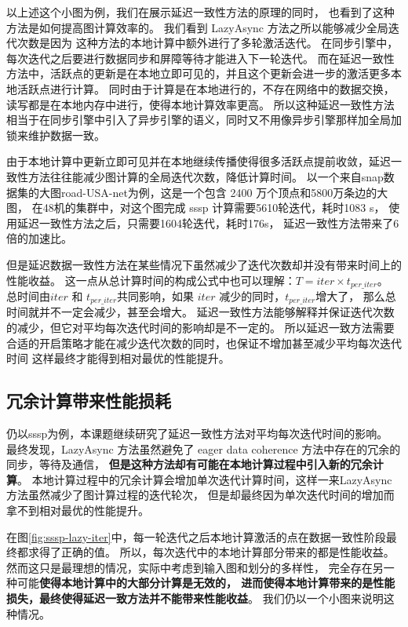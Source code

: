 以上述这个小图为例，我们在展示延迟一致性方法的原理的同时，
也看到了这种方法是如何提高图计算效率的。
我们看到 LazyAsync 方法之所以能够减少全局迭代次数是因为
这种方法的本地计算中额外进行了多轮激活迭代。
在同步引擎中，每次迭代之后要进行数据同步和屏障等待才能进入下一轮迭代。
而在延迟一致性方法中，活跃点的更新是在本地立即可见的，并且这个更新会进一步的激活更多本地活跃点进行计算。
同时由于计算是在本地进行的，不存在网络中的数据交换，读写都是在本地内存中进行，使得本地计算效率更高。
所以这种延迟一致性方法相当于在同步引擎中引入了异步引擎的语义\cite{Ju@MACS17}，同时又不用像异步引擎那样加全局加锁来维护数据一致\cite{Xie@PPoPP15}。

由于本地计算中更新立即可见并在本地继续传播使得很多活跃点提前收敛，延迟一致性方法往往能减少图计算的全局迭代次数，降低计算时间。
以一个来自snap\cite{SNAP}数据集的大图road-USA-net为例，这是一个包含 2400 万个顶点和5800万条边的大图，
在48机的集群中，对这个图完成 sssp 计算需要5610轮迭代，耗时1083 s， 使用延迟一致性方法之后，只需要1604轮迭代，耗时176s，
延迟一致性方法带来了6倍的加速比。

但是延迟数据一致性方法在某些情况下虽然减少了迭代次数却并没有带来时间上的性能收益。
这一点从总计算时间的构成公式\cite{bsp@1990}中也可以理解：$T=iter \times t_{per\_iter}$。
总时间由$iter$ 和 $t_{per\_iter}$共同影响，如果 $iter$ 减少的同时，$t_{per\_iter}$增大了，
那么总时间就并不一定会减少，甚至会增大。
延迟一致性方法能够解释并保证迭代次数的减少，但它对平均每次迭代时间的影响却是不一定的。
所以延迟一致方法需要合适的开启策略才能在减少迭代次数的同时，也保证不增加甚至减少平均每次迭代时间
这样最终才能得到相对最优的性能提升。

\subsection{冗余计算带来性能损耗}
仍以sssp为例，本课题继续研究了延迟一致性方法对平均每次迭代时间的影响。
最终发现，LazyAsync 方法虽然避免了 eager data coherence 方法中存在的冗余的同步，等待及通信，
\textbf{但是这种方法却有可能在本地计算过程中引入新的冗余计算}。
本地计算过程中的冗余计算会增加单次迭代计算时间，这样一来LazyAsync方法虽然减少了图计算过程的迭代轮次，
但是却最终因为单次迭代时间的增加而拿不到相对最优的性能提升。


在图\ref{fig:sssp-lazy-iter}中，每一轮迭代之后本地计算激活的点在数据一致性阶段最终都求得了正确的值。
所以，每次迭代中的本地计算部分带来的都是性能收益。
然而这只是最理想的情况，实际中考虑到输入图和划分的多样性，
完全存在另一种可能\textbf{使得本地计算中的大部分计算是无效的，
进而使得本地计算带来的是性能损失，最终使得延迟一致方法并不能带来性能收益}。
我们仍以一个小图来说明这种情况。


